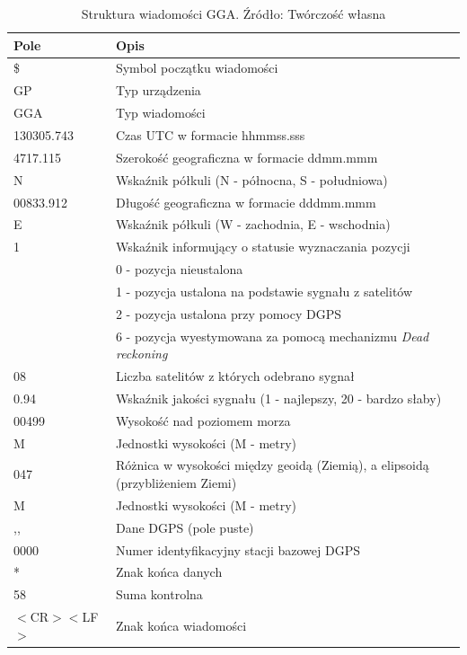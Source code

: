 \begin{table}[H]
\centering
\caption{Struktura wiadomości GGA. Źródło: Twórczość własna}
\label{table:table_nmea_gga_message}
\begin{tabular}{| l | l |}
\hline
\textbf{Pole} & \textbf{Opis} \\ \hline
\$ & Symbol początku wiadomości  \\ \hline
GP & Typ urządzenia  \\ \hline
GGA & Typ wiadomości  \\ \hline
130305.743 & Czas UTC w formacie hhmmss.sss \\ \hline
4717.115 & Szerokość geograficzna w formacie ddmm.mmm \\ \hline
N & Wskaźnik półkuli (N - północna, S - południowa) \\ \hline
00833.912 & Długość geograficzna w formacie dddmm.mmm  \\ \hline
E & Wskaźnik półkuli (W - zachodnia, E - wschodnia) \\ \hline
1 & Wskaźnik informujący o statusie wyznaczania pozycji \\ 
 & 0 - pozycja nieustalona \\ 
 & 1 - pozycja ustalona na podstawie sygnału z satelitów \\ 
 & 2 - pozycja ustalona przy pomocy DGPS \\ 
 & 6 - pozycja wyestymowana za pomocą mechanizmu \textit{Dead reckoning} \\ \hline
08 & Liczba satelitów z których odebrano sygnał \\ \hline
0.94 & Wskaźnik jakości sygnału (1 - najlepszy, 20 - bardzo słaby) \\ \hline
00499 & Wysokość nad poziomem morza \\ \hline
M & Jednostki wysokości (M - metry) \\ \hline
047 & Różnica w wysokości między geoidą (Ziemią), a elipsoidą (przybliżeniem Ziemi) \\ \hline
M & Jednostki wysokości (M - metry) \\ \hline
,, & Dane DGPS (pole puste) \\ \hline
0000 & Numer identyfikacyjny stacji bazowej DGPS \\ \hline
* & Znak końca danych \\ \hline
58 & Suma kontrolna \\ \hline
$<$CR$><$LF$>$ & Znak końca wiadomości \\ \hline
\end{tabular}
\end{table}

